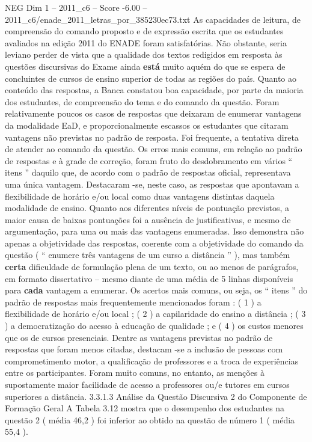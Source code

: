 \begin{textsample}{NEG Dim 1 – 2011\_c6 – Score -6.00 – 2011\_c6/enade\_2011\_letras\_por\_385230ec73.txt}
As capacidades de leitura, de compreensão do comando proposto e de expressão escrita que os estudantes avaliados na edição 2011 do ENADE foram satisfatórias.
Não obstante, seria leviano perder de vista que a qualidade dos textos redigidos em resposta às questões discursivas do Exame ainda \textbf{está} muito aquém do que se espera de concluintes de cursos de ensino superior de todas as regiões do país.
Quanto ao conteúdo das respostas, a Banca constatou boa capacidade, por parte da maioria dos estudantes, de compreensão do tema e do comando da questão.
Foram relativamente poucos os casos de respostas que deixaram de enumerar vantagens da modalidade EaD, e proporcionalmente escassos os estudantes que citaram vantagens não previstas no padrão de resposta.
Foi frequente, a tentativa direta de atender ao comando da questão.
Os erros mais comuns, em relação ao padrão de respostas e à grade de correção, foram fruto do desdobramento em vários “ itens ” daquilo que, de acordo com o padrão de respostas oficial, representava uma única vantagem.
Destacaram -se, neste caso, as respostas que apontavam a flexibilidade de horário e/ou local como duas vantagens distintas daquela modalidade de ensino.
Quanto aos diferentes níveis de pontuação previstos, a maior causa de baixas pontuações foi a ausência de justificativas, e mesmo de argumentação, para uma ou mais das vantagens enumeradas.
Isso demonstra não apenas a objetividade das respostas, coerente com a objetividade do comando da questão ( “ enumere três vantagens de um curso a distância ” ), mas também \textbf{certa} dificuldade de formulação plena de um texto, ou ao menos de parágrafos, em formato dissertativo – mesmo diante de uma média de 5 linhas disponíveis para \textbf{cada} vantagem a enumerar.
Os acertos mais comuns, ou seja, os “ itens ” do padrão de respostas mais frequentemente mencionados foram : ( 1 ) a flexibilidade de horário e/ou local ; ( 2 ) a capilaridade do ensino a distância ; ( 3 ) a democratização do acesso à educação de qualidade ; e ( 4 ) os custos menores que os de cursos presenciais.
Dentre as vantagens previstas no padrão de respostas que foram menos citadas, destacam -se a inclusão de pessoas com comprometimento motor, a qualificação de professores e a troca de experiências entre os participantes.
Foram muito comuns, no entanto, as menções à supostamente maior facilidade de acesso a professores ou/e tutores em cursos superiores a distância. 3.3.1.3 Análise da Questão Discursiva 2 do Componente de Formação Geral A Tabela 3.12 mostra que o desempenho dos estudantes na questão 2 ( média 46,2 ) foi inferior ao obtido na questão de número 1 ( média 55,4 ).

\end{textsample}

